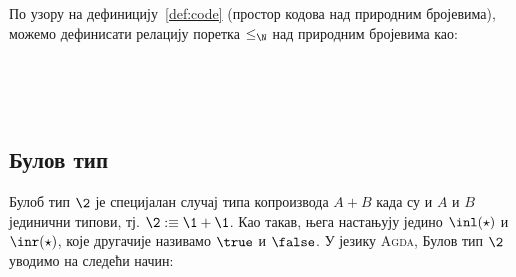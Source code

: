 По узору на дефиницију~\ref{def:code} (простор кодова над природним бројевима), можемо дефинисати релацију поретка $\leq_\N$ над природним бројевима као:
\begin{code}%
\>[0]\AgdaSpace{}%
\AgdaSymbol{:}\AgdaSpace{}%
\AgdaSpace{}%
\AgdaSpace{}%
\AgdaSpace{}%
\AgdaSpace{}%
\AgdaSpace{}%
\<%
\\
\>[0]\AgdaSpace{}%
\AgdaSpace{}%
\AgdaSpace{}%
\AgdaSymbol{=}\AgdaSpace{}%
\<%
\\
\>[0]\AgdaSpace{}%
\AgdaSpace{}%
\AgdaSpace{}%
\AgdaSpace{}%
\AgdaSymbol{=}\AgdaSpace{}%
\<%
\\
\>[0]\AgdaSpace{}%
\AgdaSpace{}%
\AgdaSpace{}%
\AgdaSpace{}%
\AgdaSpace{}%
\AgdaSymbol{=}\AgdaSpace{}%
\AgdaSpace{}%
\AgdaSpace{}%
\<%
\end{code}

\subsection{Булов тип}

Булоб тип $\2$ је специјалан случај типа копроизвода $A + B$ када су и $A$ и $B$ јединични типови, тј. $\2 :\equiv \1 + \1$. Као такав, њега настањују једино $\inl(\star)$ и $\inr(\star)$, које другачије називамо $\true$ и $\false$. У језику \textsc{Agda}, Булов тип $\2$ уводимо на следећи начин: 
\begin{code}%
\>[0]\AgdaSpace{}%
\AgdaSymbol{:}\AgdaSpace{}%
\AgdaSpace{}%
\<%
\\
\>[0]\AgdaSpace{}%
\AgdaSymbol{=}\AgdaSpace{}%
\AgdaSpace{}%
\AgdaOperator{\AgdaDatatype{+}}\AgdaSpace{}%
\<%
\\
%
\\[\AgdaEmptyExtraSkip]%
\>[0]\AgdaSpace{}%
%
\>[14]\AgdaSymbol{=}\AgdaSpace{}%
\AgdaSpace{}%
\<%
\\
\>[0]\AgdaSpace{}%
\AgdaSpace{}%
\AgdaSymbol{=}\AgdaSpace{}%
\AgdaSpace{}%
\<%
\end{code}

